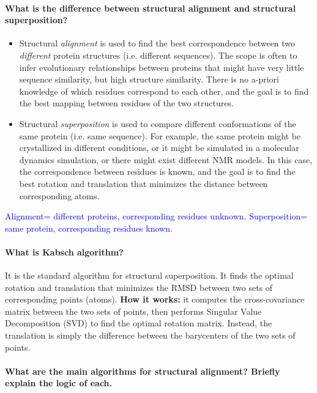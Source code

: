 \paragraph{What is the difference between structural alignment and structural superposition? \done}
\begin{itemize}
\item Structural \textit{alignment} is used to find the best correspondence between two \textit{different} protein structures (i.e. different sequences). The scope
is often to infer evolutionary relationships between proteins that might have very little sequence similarity, but high structure similarity. There is no a-priori knowledge
of which residues correspond to each other, and the goal is to find the best mapping between residues of the two structures.
\item Structural \textit{superposition} is used to compare different conformations of the same protein (i.e. same sequence). For example, the same protein might be crystallized in different conditions, or it might be simulated in a molecular dynamics simulation, or
there might exist different NMR models. In this case, the correspondence between residues is known, and the goal is to find the best rotation and translation that minimizes the distance between corresponding atoms.
\end{itemize}
\medskip \noindent
\textcolor{blue}{Alignment= different proteins, corresponding residues unknown. Superposition= same protein, corresponding residues known.}


\paragraph{What is Kabsch algorithm? \done}
It is the standard algorithm for structural superposition. It finds the optimal rotation and translation that minimizes the RMSD between two sets of corresponding points (atoms). 
\textbf{How it works:} it computes the cross-covariance matrix between the two sets of points, then performs Singular Value Decomposition (SVD) to find the optimal rotation matrix. Instead, the translation is simply the difference between the barycenters of the two sets of points. 



\paragraph{What are the main algorithms for structural alignment? Briefly explain the logic of each.}
\noindent 

